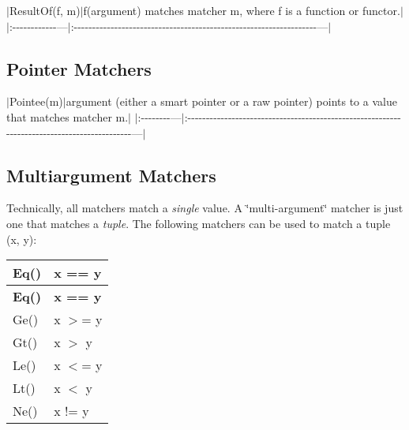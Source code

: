 $\vert${\ttfamily Result\+Of(f, m)}$\vert${\ttfamily f(argument)} matches matcher {\ttfamily m}, where {\ttfamily f} is a function or functor.$\vert$ $\vert$\+:-\/-\/-\/-\/-\/-\/-\/-\/-\/-\/-\/-\/---$\vert$\+:-\/-\/-\/-\/-\/-\/-\/-\/-\/-\/-\/-\/-\/-\/-\/-\/-\/-\/-\/-\/-\/-\/-\/-\/-\/-\/-\/-\/-\/-\/-\/-\/-\/-\/-\/-\/-\/-\/-\/-\/-\/-\/-\/-\/-\/-\/-\/-\/-\/-\/-\/-\/-\/-\/-\/-\/-\/-\/-\/-\/-\/-\/-\/-\/-\/-\/---$\vert$

\subsection*{Pointer Matchers}

$\vert${\ttfamily Pointee(m)}$\vert${\ttfamily argument} (either a smart pointer or a raw pointer) points to a value that matches matcher {\ttfamily m}.$\vert$ $\vert$\+:-\/-\/-\/-\/-\/-\/-\/-\/---$\vert$\+:-\/-\/-\/-\/-\/-\/-\/-\/-\/-\/-\/-\/-\/-\/-\/-\/-\/-\/-\/-\/-\/-\/-\/-\/-\/-\/-\/-\/-\/-\/-\/-\/-\/-\/-\/-\/-\/-\/-\/-\/-\/-\/-\/-\/-\/-\/-\/-\/-\/-\/-\/-\/-\/-\/-\/-\/-\/-\/-\/-\/-\/-\/-\/-\/-\/-\/-\/-\/-\/-\/-\/-\/-\/-\/-\/-\/-\/-\/-\/-\/-\/-\/-\/-\/-\/-\/-\/-\/-\/-\/-\/-\/---$\vert$

\subsection*{Multiargument Matchers}

Technically, all matchers match a {\itshape single} value. A \char`\"{}multi-\/argument\char`\"{} matcher is just one that matches a {\itshape tuple}. The following matchers can be used to match a tuple {\ttfamily (x, y)}\+:

\tabulinesep=1mm
\begin{longtabu}spread 0pt [c]{*{2}{|X[-1]}|}
\hline
\cellcolor{\tableheadbgcolor}\textbf{ {\ttfamily Eq()}  }&\cellcolor{\tableheadbgcolor}\textbf{ {\ttfamily x == y}   }\\
\endfirsthead
\hline
\endfoot
\hline
\cellcolor{\tableheadbgcolor}\textbf{ {\ttfamily Eq()}  }&\cellcolor{\tableheadbgcolor}\textbf{ {\ttfamily x == y}   }\\
\endhead
{\ttfamily Ge()}  &{\ttfamily x $>$= y}   \\
{\ttfamily Gt()}  &{\ttfamily x $>$ y}   \\
{\ttfamily Le()}  &{\ttfamily x $<$= y}   \\
{\ttfamily Lt()}  &{\ttfamily x $<$ y}   \\
{\ttfamily Ne()}  &{\ttfamily x != y}   \\
\end{longtabu}



